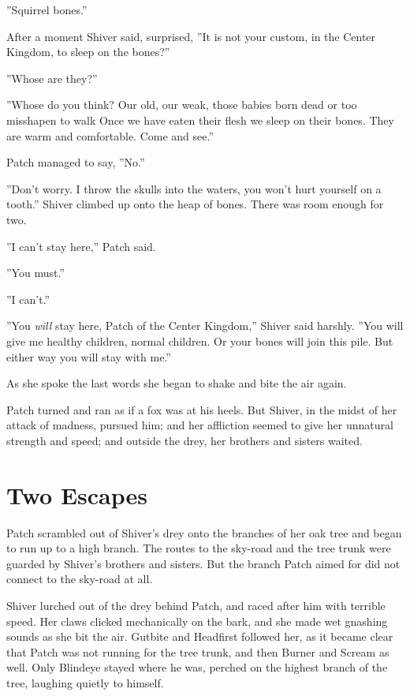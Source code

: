 \documentclass[12pt]{book}
\begin{document}
''Squirrel bones.''

After a moment Shiver said, surprised, ''It is not your custom, in the Center Kingdom, to sleep on the bones?''

''Whose are they?''

''Whose do you think? Our old, our weak, those babies born dead or too misshapen to walk%
Once we have eaten their flesh we sleep on their bones. They are warm and comfortable. Come and see.''

Patch managed to say, ''No.''

''Don't worry. I throw the skulls into the waters, you won't hurt yourself on a tooth.'' Shiver climbed up onto the heap of bones. There was room enough for two.

''I can't stay here,'' Patch said.

''You must.''

''I can't.''

''You {\it will} stay here, Patch of the Center Kingdom,'' Shiver said harshly. ''You will give me healthy children, normal children. Or your bones will join this pile. But either way you will stay with me.''

As she spoke the last words she began to shake and bite the air again.

Patch turned and ran as if a fox was at his heels. But Shiver, in the midst of her attack of madness, pursued him; and her affliction seemed to give her unnatural strength and speed; and outside the drey, her brothers and sisters waited.


\section{Two Escapes}

Patch scrambled out of Shiver's drey onto the branches of her oak tree and began to run up to a high branch. The routes to the sky-road and the tree trunk were guarded by Shiver's brothers and sisters. But the branch Patch aimed for did not connect to the sky-road at all.

Shiver lurched out of the drey behind Patch, and raced after him with terrible speed. Her claws clicked mechanically on the bark, and she made wet gnashing sounds as she bit the air. Gutbite and Headfirst followed her, as it became clear that Patch was not running for the tree trunk, and then Burner and Scream as well. Only Blindeye stayed where he was, perched on the highest branch of the tree, laughing quietly to himself.
\end{document}
